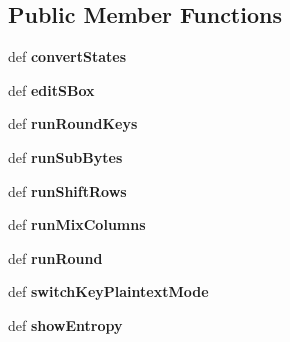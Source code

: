 \subsection*{Public Member Functions}
\begin{DoxyCompactItemize}
\item 
\hypertarget{classsimplegui3_1_1_main_scene_aafb3c51f43351c02447d17c4e8c1fe6d}{def {\bfseries convert\-States}}\label{classsimplegui3_1_1_main_scene_aafb3c51f43351c02447d17c4e8c1fe6d}

\item 
\hypertarget{classsimplegui3_1_1_main_scene_ad09e8a3fe52fa195f7d35ddc0f101056}{def {\bfseries edit\-S\-Box}}\label{classsimplegui3_1_1_main_scene_ad09e8a3fe52fa195f7d35ddc0f101056}

\item 
\hypertarget{classsimplegui3_1_1_main_scene_a59b6e7ba6cf886c977bf5795cf72099c}{def {\bfseries run\-Round\-Keys}}\label{classsimplegui3_1_1_main_scene_a59b6e7ba6cf886c977bf5795cf72099c}

\item 
\hypertarget{classsimplegui3_1_1_main_scene_a2b683152734a69a8a09940400a5e2f11}{def {\bfseries run\-Sub\-Bytes}}\label{classsimplegui3_1_1_main_scene_a2b683152734a69a8a09940400a5e2f11}

\item 
\hypertarget{classsimplegui3_1_1_main_scene_aae7b9108cc0710126d9fd648616ef8e2}{def {\bfseries run\-Shift\-Rows}}\label{classsimplegui3_1_1_main_scene_aae7b9108cc0710126d9fd648616ef8e2}

\item 
\hypertarget{classsimplegui3_1_1_main_scene_a48b2418e3c6136be18a58c280b04a287}{def {\bfseries run\-Mix\-Columns}}\label{classsimplegui3_1_1_main_scene_a48b2418e3c6136be18a58c280b04a287}

\item 
\hypertarget{classsimplegui3_1_1_main_scene_a06d8b7a89ef09ec702d52479f8749a0f}{def {\bfseries run\-Round}}\label{classsimplegui3_1_1_main_scene_a06d8b7a89ef09ec702d52479f8749a0f}

\item 
\hypertarget{classsimplegui3_1_1_main_scene_ac0c86b509849101d4986016d670ec864}{def {\bfseries switch\-Key\-Plaintext\-Mode}}\label{classsimplegui3_1_1_main_scene_ac0c86b509849101d4986016d670ec864}

\item 
\hypertarget{classsimplegui3_1_1_main_scene_a5df983af1c795633095e0819a6360a9b}{def {\bfseries show\-Entropy}}\label{classsimplegui3_1_1_main_scene_a5df983af1c795633095e0819a6360a9b}


\end{DoxyCompactItemize}

